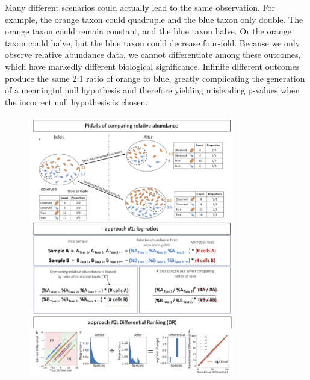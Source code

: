 Many different scenarios could actually lead to the same observation. For example, the orange taxon could quadruple and the blue taxon only double. The orange taxon could remain constant, and the blue taxon halve. Or the orange taxon could halve, but the blue taxon could decrease four-fold. Because we only observe relative abundance data, we cannot differentiate among these outcomes, which have markedly different biological significance. Infinite different outcomes produce the same 2:1 ratio of orange to blue, greatly complicating the generation of a meaningful null hypothesis and therefore yielding misleading p-values when the incorrect null hypothesis is chosen.

\begin{figure}
  \centering
  \includegraphics[width=0.8\textwidth]{ch4/Figure1.png}
  \caption[Illustration demonstrating statistical limitations inherent to compositional datasets.]{
}
\end{figure}
